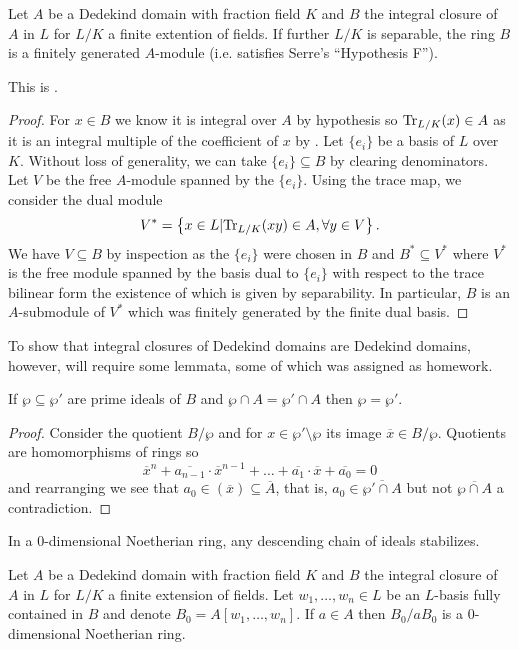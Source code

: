 \begin{proposition}
  Let $A$ be a Dedekind domain with fraction field $K$ and $B$ the integral closure of $A$ in $L$ for $L/K$ a finite extention of fields. If further $L/K$ is separable, the ring $B$ is a finitely generated $A$-module (i.e. satisfies Serre's ``Hypothesis F''). 
\end{proposition}
This is \cite[Ch. 1, \S 4, Prop. 8]{Serre}. 
\begin{proof}
  For $x\in B$ we know it is integral over $A$ by hypothesis so $\mathrm{Tr}_{L/K}(x)\in A$ as it is an integral multiple of the coefficient of $x$ by \cite[\href{https://stacks.math.columbia.edu/tag/0BIH}{0BIH}]{stacks-project}. Let $\{e_{i}\}$ be a basis of $L$ over $K$. Without loss of generality, we can take $\{e_{i}\}\subseteq B$ by clearing denominators. Let $V$ be the free $A$-module spanned by the $\{e_{i}\}$. Using the trace map, we consider the dual module 
  $$V^{*}=\left\{x\in L|\mathrm{Tr}_{L/K}(xy)\in A, \forall y\in V\right\}.$$
  We have $V\subseteq B$ by inspection as the $\{e_{i}\}$ were chosen in $B$ and $B^{*}\subseteq V^{*}$ where $V^{*}$ is the free module spanned by the basis dual to $\{e_{i}\}$ with respect to the trace bilinear form the existence of which is given by separability. In particular, $B$ is an $A$-submodule of $V^{*}$ which was finitely generated by the finite dual basis. 
\end{proof}
To show that integral closures of Dedekind domains are Dedekind domains, however, will require some lemmata, some of which was assigned as homework. 
\begin{lemma}\label{lem: equality of primes in B}
  If $\wp\subseteq\wp'$ are prime ideals of $B$ and $\wp\cap A=\wp'\cap A$ then $\wp=\wp'$. 
\end{lemma}
\begin{proof}
  Consider the quotient $B/\wp$ and for $x\in\wp'\setminus\wp$ its image $\overline{x}\in B/\wp$. Quotients are homomorphisms of rings so
  $$\overline{x}^{n}+\overline{a_{n-1}}\cdot\overline{x}^{n-1}+\dots+\overline{a_{1}}\cdot\overline{x}+\overline{a_{0}}=0$$
  and rearranging we see that $a_{0}\in(\overline{x})\subseteq\overline{A}$, that is, $a_{0}\in\overline{\wp'\cap A}$ but not $\overline{\wp\cap A}$ a contradiction. 
\end{proof}
\begin{lemma}\label{lem:descending chain stabilizes}
  In a 0-dimensional Noetherian ring, any descending chain of ideals stabilizes. 
\end{lemma}
\begin{lemma}\label{lem: ring B0}
  Let $A$ be a Dedekind domain with fraction field $K$ and $B$ the integral closure of $A$ in $L$ for $L/K$ a finite extension of fields. Let $w_{1},\dots,w_{n}\in L$ be an $L$-basis fully contained in $B$ and denote $B_{0}=A[w_{1},\dots,w_{n}]$. If $a\in A$ then $B_{0}/aB_{0}$ is a 0-dimensional Noetherian ring. 
\end{lemma}
